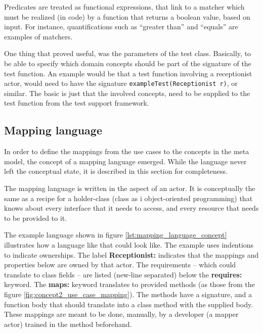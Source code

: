 \noindent 
Predicates are treated as functional expressions, that link to a matcher which must be realized (in code) by a function that returns a boolean value, based on input. For instance, quantifications such as ``greater than'' and ``equals'' are examples of matchers.\medskip

\noindent 
One thing that proved useful, was the parameters of the test class. Basically, to be able to specify which domain concepts should be part of the signature of the test function. An example would be that a test function involving a receptionist actor, would need to have the signature \texttt{exampleTest(Receptionist r)}, or similar. The basic is just that the involved concepts, need to be supplied to the test function from the test support framework.
\subsection{Mapping language}
In order to define the mappings from the use cases to the concepts in the meta model, the concept of a mapping language emerged. While the language never left the conceptual state, it is described in this section for completeness.\medskip

\noindent The mapping language is written in the aspect of an actor. It is conceptually the same as a recipe for a holder-class (class as i object-oriented programming) that knows about every interface that it needs to access, and every resource that needs to be provided to it.\medskip

\noindent The example language shown in figure \ref{lst:mapping_language_concept} illustrates how a language like that could look like. The example uses indentions to indicate ownerships. The label \textbf{Receptionist:} indicates that the mappings and properties below are owned by that actor. The requirements -- which could translate to class fields -- are listed (new-line separated) below the \textbf{requires:} keyword. The \textbf{maps:} keyword translates to provided methods (as those from the figure \ref{fig:concept2_use_case_mapping}). The methods have a signature, and a function body that should translate into a class method with the supplied body. These mappings are meant to be done, manually, by a developer (a mapper actor) trained in the method beforehand.\medskip

